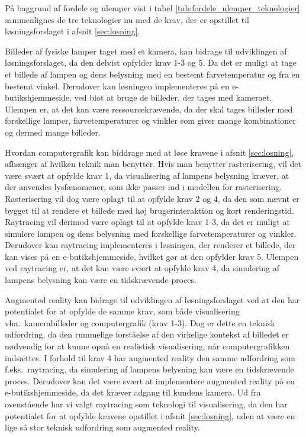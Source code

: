 På baggrund af fordele og ulemper vist i tabel \ref{tab:fordele_ulemper_teknologier} sammenlignes de tre teknologier nu med de krav, der er opstillet til løsningsforslaget i afsnit \ref{sec:losning}. 

Billeder af fysiske lamper taget med et kamera, kan bidrage til udviklingen af løsningsforslaget, da den delvist opfylder krav 1-3 og 5. Da det er muligt at tage et billede af lampen og dens belysning med en bestemt farvetemperatur og fra en bestemt vinkel. Derudover kan løsningen implementeres på en e-butikshjemmeside, ved blot at bruge de billeder, der tages med kameraet. Ulempen er, at det kan være ressourcekrævende, da der skal tages billeder med forskellige lamper, farvetemperaturer og vinkler som giver mange kombinationer og dermed mange billeder.

Hvordan computergrafik kan biddrage med at løse kravene i afsnit \ref{sec:losning}, afhænger af hvilken teknik man benytter. Hvis man benytter rasterisering, vil det være svært at opfylde krav 1, da visualisering af lampens belysning kræver, at der anvendes lysfænomener, som ikke passer ind i modellen for rasterisering. Rasterisering vil dog være oplagt til at opfylde krav 2 og 4, da den som nævnt er bygget til at rendere et billede med høj brugerinteraktion og kort renderingstid.
Raytracing vil derimod være oplagt til at opfylde krav 1-3, da det er muligt at simulere lampen og dens belysning med forskellige farvetemperaturer og vinkler. Derudover kan raytracing implementeres i løsningen, der renderer et billede, der kan vises på en e-butikshjemmeside, hvilket gør at den opfylder krav 5. Ulempen ved raytracing er, at det kan være svært at opfylde krav 4, da simulering af lampens belysning kan være en tidskrævende proces.

Augmented reality kan bidrage til udviklingen af løsningsforslaget ved at den har potentialet for at opfylde de samme krav, som både visualisering vha.\ kamerabilleder og computergrafik (krav 1-3). Dog er dette en teknisk udfordring, da den rummelige forståelse af den virkelige kontekst af billedet er nødvendig for at kunne opnå en realistisk visualisering, når computergrafikken indsættes. I forhold til krav 4 har augmented reality den samme udfordring som f.eks.\ raytracing, da simulering af lampens belysning kan være en tidskrævende proces. Derudover kan det være svært at implementere augmented reality på en e-butikshjemmeside, da det kræver adgang til kundens kamera. Ud fra ovenstående har vi valgt raytracing som teknologi til visualisering, da den har potentialet for at opfylde kravene opstillet i afsnit \ref{sec:losning}, uden at være en lige så stor teknisk udfordring som augmented reality. 


\clearpage

